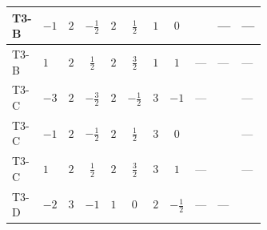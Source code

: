 \documentclass[8pt]{article}
\begin{document}
\begin{landscape}
\begin{longtable}{@{}llcccccc >{\raggedright\arraybackslash}p{0.21\linewidth} >{\raggedright\arraybackslash}p{0.21\linewidth} >{\raggedright\arraybackslash}p{0.21\linewidth}@{}}
T3-B & $-1$ & $2$ & $-\frac{1}{2}$ & $2$ & $\frac{1}{2}$ & $1$ & $0$ & \scriptsize\adjustbox{max width=\linewidth}{$\begin{gathered} +{\lambda_{H H^\dagger S_1^\dagger S_2^\dagger}^{\rm Cross}} (4 \left({\lambda_{H H^\dagger S_1^\dagger S_2^\dagger}^{\rm Cross}}\right)^{*}+3 \left({\lambda_{11}}\right)^{*})\end{gathered}$} & --- & --- \\
\midrule
T3-B & $1$ & $2$ & $\frac{1}{2}$ & $2$ & $\frac{3}{2}$ & $1$ & $1$ & --- & --- & --- \\
\midrule
T3-C & $-3$ & $2$ & $-\frac{3}{2}$ & $2$ & $-\frac{1}{2}$ & $3$ & $-1$ & --- & \scriptsize\adjustbox{max width=\linewidth}{$\begin{gathered} {\lambda_{HS_1}^{(1)}} (3 T_{\nu}^{(1)}+6 \operatorname{Tr}\!\left({Y_d}\,\left({Y_d}\right)^{\dagger}\right)+2 \operatorname{Tr}\!\left({Y_e}\,\left({Y_e}\right)^{\dagger}\right)+6 \operatorname{Tr}\!\left({Y_u}\,\left({Y_u}\right)^{\dagger}\right))\end{gathered}$} & --- \\
\midrule
T3-C & $-1$ & $2$ & $-\frac{1}{2}$ & $2$ & $\frac{1}{2}$ & $3$ & $0$ & \scriptsize\adjustbox{max width=\linewidth}{$\begin{gathered} +{\lambda_{H H^\dagger S_1^\dagger S_2^\dagger}^{\rm Cross}} (4 \left({\lambda_{H H^\dagger S_1^\dagger S_2^\dagger}^{\rm Cross}}\right)^{*}+3 \left({\lambda_{11}}\right)^{*})\end{gathered}$} & \scriptsize\adjustbox{max width=\linewidth}{$\begin{gathered} {\lambda_{HS_1}^{(1)}} (3 T_{\nu}^{(1)}+6 \operatorname{Tr}\!\left({Y_d}\,\left({Y_d}\right)^{\dagger}\right)+2 \operatorname{Tr}\!\left({Y_e}\,\left({Y_e}\right)^{\dagger}\right)+6 \operatorname{Tr}\!\left({Y_u}\,\left({Y_u}\right)^{\dagger}\right))\end{gathered}$} & --- \\
\midrule
T3-C & $1$ & $2$ & $\frac{1}{2}$ & $2$ & $\frac{3}{2}$ & $3$ & $1$ & --- & \scriptsize\adjustbox{max width=\linewidth}{$\begin{gathered} {\lambda_{HS_1}^{(1)}} (3 T_{\nu}^{(1)}+6 \operatorname{Tr}\!\left({Y_d}\,\left({Y_d}\right)^{\dagger}\right)+2 \operatorname{Tr}\!\left({Y_e}\,\left({Y_e}\right)^{\dagger}\right)+6 \operatorname{Tr}\!\left({Y_u}\,\left({Y_u}\right)^{\dagger}\right))\end{gathered}$} & --- \\
\midrule
T3-D & $-2$ & $3$ & $-1$ & $1$ & $0$ & $2$ & $-\frac{1}{2}$ & --- & --- & \scriptsize\adjustbox{max width=\linewidth}{$\begin{gathered} {\lambda_{HS_1}^{(1)}} (2 T_{\nu}^{(1)}+6 \operatorname{Tr}\!\left({Y_d}\,\left({Y_d}\right)^{\dagger}\right)+2 \operatorname{Tr}\!\left({Y_e}\,\left({Y_e}\right)^{\dagger}\right)+6 \operatorname{Tr}\!\left({Y_u}\,\left({Y_u}\right)^{\dagger}\right)+4 {\lambda_{S_1}^{(A)}})\end{gathered}$} \\

\end{longtable}
\end{landscape}
\end{document}
